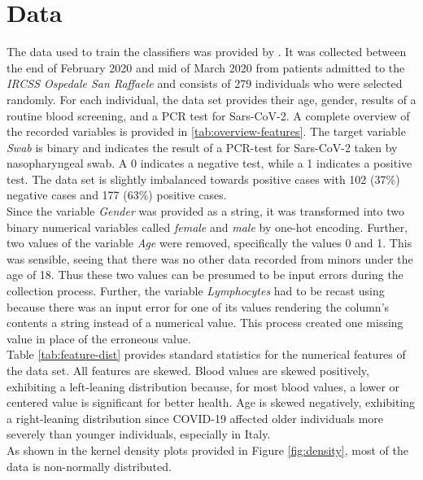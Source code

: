 \section{Data}
The data used to train the classifiers was provided by 
\citeauthor{RN127} \cite{RN127}. 
It was collected between the end of February 2020 and mid of March 2020 from 
patients admitted to the \textit{IRCSS Ospedale San Raffaele} and consists of 
279 individuals who were selected randomly.
For each individual, the data set provides their age, gender, results of a 
routine blood screening, and a PCR test for Sars-CoV-2.
A complete overview of the recorded variables is provided in 
\ref{tab:overview-features}. The target variable \textit{Swab} is binary and 
indicates the result of a PCR-test for Sars-CoV-2 taken by nasopharyngeal 
swab. A 0 indicates a negative test, while a 1 indicates a positive test.
The data set is slightly imbalanced towards positive cases with 102 (37\%) 
negative cases and 177 (63\%) positive cases.
\\
Since the variable \textit{Gender} 
was provided as a string, it was transformed into two binary numerical 
variables called \textit{female} and \textit{male} by one-hot encoding.
Further, two values of the variable \textit{Age} were removed, specifically 
the values 0 and 1. This was sensible, seeing that there was no other 
data recorded from minors under the age of 18. Thus these two values can 
be presumed to be input errors during the collection process.
Further, the variable \textit{Lymphocytes} had to be recast using 
 because there was an input error for one of its 
values rendering the column's contents a string instead of a numerical 
value. This process created one missing value in place of the erroneous value.
\\
Table \ref{tab:feature-dist} provides standard statistics for the numerical 
features of the data set.
All features are skewed. Blood values are 
skewed positively, exhibiting a left-leaning distribution because, for most 
blood values, a lower or centered value is significant for better health. Age 
is skewed negatively, exhibiting a right-leaning distribution since COVID-19 
affected older individuals more severely than younger individuals, especially 
in Italy. 
\\
As shown in the kernel density plots provided in Figure \ref{fig:density}, most 
of the data is non-normally distributed.
